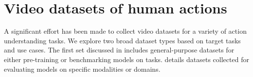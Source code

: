\begin{table}
{\begin{tabular}{l l l l l r l}
      \end{tabular}
    }
    \label{tab:action_recognition_datasets}
    \vspace{-1em}
\end{table}

\section{Video datasets of human actions}
\label{sec:datasets}

A significant effort has been made to collect video datasets for a variety of action understanding tasks. We explore two broad dataset types based on target tasks and use cases. The first set discussed in  includes general-purpose datasets for either pre-training or benchmarking models on tasks.  details datasets collected for evaluating models on specific modalities or domains.



